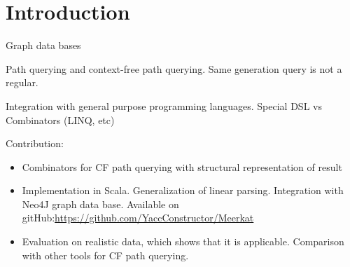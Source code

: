 \section{Introduction}

Graph data bases

Path querying and context-free path querying.
Same generation query is not a regular.

Integration with general purpose programming languages.
Special DSL vs Combinators (LINQ, etc)~\cite{ScalaGraphParsing}

Contribution:
\begin{itemize}
\item Combinators for CF path querying with structural representation of result
\item Implementation in Scala. Generalization of linear parsing. Integration with Neo4J graph data base. Available on gitHub:\url{https://github.com/YaccConstructor/Meerkat}
\item Evaluation on realistic data, which shows that it is applicable. Comparison  with other tools 
for CF path querying.
\end{itemize}